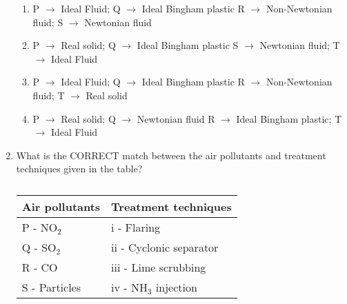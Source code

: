 \documentclass[journal,12pt,onecolumn]{article}
\theoremstyle{remark}
\begin{document}
\begin{enumerate}
    \hfill{}
    \begin{enumerate}
        \item P $\rightarrow$ Ideal Fluid; Q $\rightarrow$ Ideal Bingham plastic
        R $\rightarrow$ Non-Newtonian fluid; S $\rightarrow$ Newtonian fluid
        \item P $\rightarrow$ Real solid; Q $\rightarrow$ Ideal Bingham plastic
        S $\rightarrow$ Newtonian fluid; T $\rightarrow$ Ideal Fluid
        \item P $\rightarrow$ Ideal Fluid; Q $\rightarrow$ Ideal Bingham plastic
        R $\rightarrow$ Non-Newtonian fluid; T $\rightarrow$ Real solid
        \item P $\rightarrow$ Real solid; Q $\rightarrow$ Newtonian fluid
        R $\rightarrow$ Ideal Bingham plastic; T $\rightarrow$ Ideal Fluid
    \end{enumerate}
    
    \item What is the CORRECT match between the air pollutants and treatment techniques
    given in the table?
    \begin{table}[H]
        \centering
        \begin{tabular}{|l|l|}
        \hline
        \textbf{Air pollutants} & \textbf{Treatment techniques} \\ \hline
        P - NO$_2$ & i - Flaring \\
        Q - SO$_2$ & ii - Cyclonic separator \\
        R - CO & iii - Lime scrubbing \\
        S - Particles & iv - NH$_3$ injection \\ \hline
        \end{tabular}
        \caption{}
        \label{tab:q25}
    \end{table}
    
    \hfill{}
    \begin{enumerate}
    \end{enumerate}
    

\end{enumerate}
\end{document}
